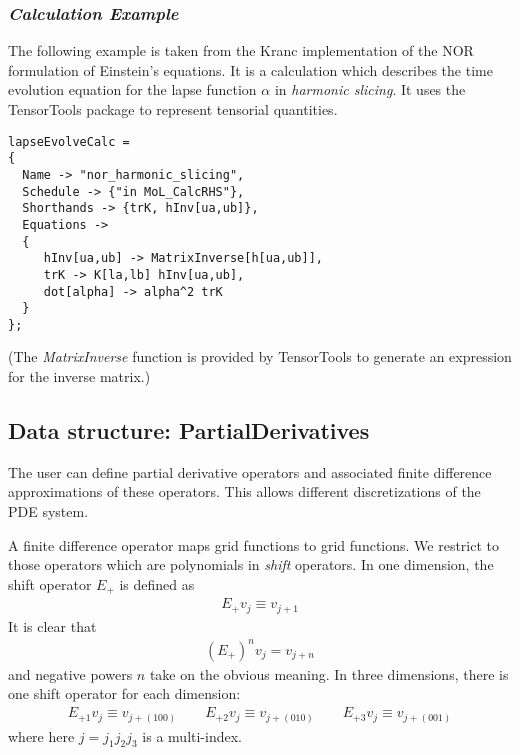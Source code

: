 \documentclass{report}
\begin{document}
\subsubsection{{\it Calculation Example}}

The following example is taken from the Kranc implementation of the
NOR formulation of Einstein's equations.  It is a calculation which
describes the time evolution equation for the lapse function $\alpha$
in {\em harmonic slicing}.  It uses the TensorTools package to
represent tensorial quantities.

\begin{center}
\begin{minipage}{0.8 \textwidth}
\begin{verbatim}
lapseEvolveCalc = 
{
  Name -> "nor_harmonic_slicing",
  Schedule -> {"in MoL_CalcRHS"},
  Shorthands -> {trK, hInv[ua,ub]},
  Equations -> 
  {
     hInv[ua,ub] -> MatrixInverse[h[ua,ub]],
     trK -> K[la,lb] hInv[ua,ub],
     dot[alpha] -> alpha^2 trK
  }
};
\end{verbatim}
\end{minipage}
\end{center}
(The {\it MatrixInverse} function is provided by TensorTools to
generate an expression for the inverse matrix.)



\subsection{Data structure: PartialDerivatives}

The user can define partial derivative operators and associated finite
difference approximations of these operators.  This allows different
discretizations of the PDE system.

A finite difference operator maps grid functions to grid functions.
We restrict to those operators which are polynomials in {\em shift}
operators.  In one dimension, the shift operator $E_+$ is defined as 
\begin{eqnarray}
E_+ v_j \equiv v_{j+1}
\end{eqnarray}
It is clear that
\begin{eqnarray}
(E_+)^n v_j = v_{j+n}
\end{eqnarray}
and negative powers $n$ take on the obvious meaning.  In three
dimensions, there is one shift operator for each dimension:
\begin{eqnarray}
E_{+1} v_j \equiv v_{j+(100)} \qquad
E_{+2} v_j \equiv v_{j+(010)} \qquad
E_{+3} v_j \equiv v_{j+(001)}
\end{eqnarray}
where here $j = j_1 j_2 j_3$ is a multi-index.
\end{document}
